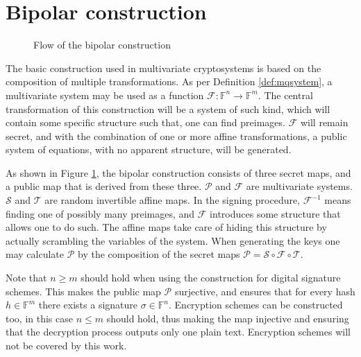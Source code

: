\documentclass{ufsctex/ufsctex}
\begin{document}
\section{Bipolar construction}\label{sec:bipolar}

\begin{figure}
\centering
{}
\caption{Flow of the bipolar construction}\label{fig:bipolar}
\end{figure}

The basic construction used in multivariate cryptosystems is based on the
composition of multiple transformations. As per Definition \ref{def:mqsystem},
a multivariate system may be used as a function
$\mathcal{F}:\mathbb{F}^n\to\mathbb{F}^m$. The central transformation of this
construction will be a system of such kind, which will contain some specific
structure such that, one can find preimages. $\mathcal{F}$ will remain secret,
and with the combination of one or more affine transformations, a public system
of equations, with no apparent structure, will be generated.

As shown in Figure \ref{fig:bipolar}, the bipolar construction consists of
three secret maps, and a public map that is derived from these three.
$\mathcal{P}$ and $\mathcal{F}$ are multivariate systems. $\mathcal{S}$ and
$\mathcal{T}$ are random invertible affine maps. In the signing procedure,
$\mathcal{F}^{-1}$ means finding one of possibly many preimages, and
$\mathcal{F}$ introduces some structure that allows one to do such. The affine
maps take care of hiding this structure by actually scrambling the variables of
the system. When generating the keys one may calculate $\mathcal{P}$ by the
composition of the secret maps $\mathcal{P} = \mathcal{S} \circ \mathcal{F}
\circ \mathcal{T}$.

Note that $n \geq m$ should hold when using the construction for digital
signature schemes. This makes the public map $\mathcal{P}$ surjective, and
ensures that for every hash $h \in \mathbb{F}^m$ there exists a signature
$\sigma \in \mathbb{F}^n$. Encryption schemes can be constructed too, in this
case $n \leq m$ should hold, thus making the map injective and ensuring that
the decryption process outputs only one plain text. Encryption schemes will not
be covered by this work.
\end{document}
